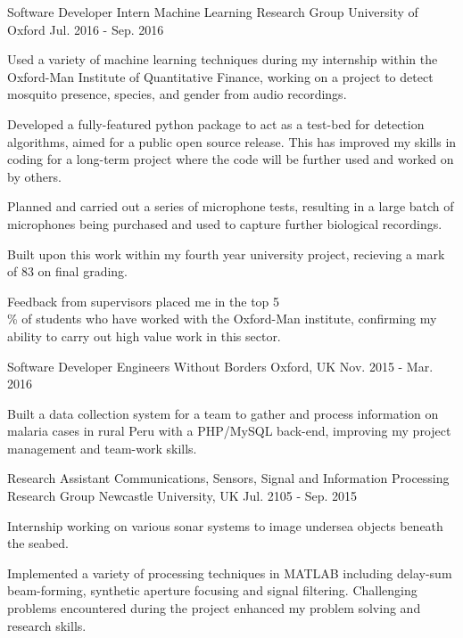 \begin{cventries}
    \cventry
        {Software Developer Intern}
        {Machine Learning Research Group}
        {University of Oxford}
        {Jul. 2016 - Sep. 2016}
        {
            \begin{cvitems}
                \item{Used a variety of machine learning techniques during my internship within the Oxford-Man Institute of Quantitative Finance, working on a project to detect mosquito presence, species, and gender from audio recordings.}
                \item{Developed a fully-featured python package to act as a test-bed for detection algorithms, aimed for a public open source release. This has improved my skills in coding for a long-term project where the code will be further used and worked on by others.}
                \item{Planned and carried out a series of microphone tests, resulting in a large batch of microphones being purchased and used to capture further biological recordings.}
                \item{Built upon this work within my fourth year university project, recieving a mark of 83 on final grading.}
                \item{Feedback from supervisors placed me in the top 5\\\% of students who have worked with the Oxford-Man institute, confirming my ability to carry out high value work in this sector.}
            \end{cvitems}
        }


    \cventry
        {Software Developer}
        {Engineers Without Borders}
        {Oxford, UK}
        {Nov. 2015 - Mar. 2016}
        {
            \begin{cvitems}
                \item{Built a data collection system for a team to gather and process information on malaria cases in rural Peru with a PHP/MySQL back-end, improving my project management and team-work skills.}
            \end{cvitems}
        }


    \cventry
        {Research Assistant}
        {Communications, Sensors, Signal and Information Processing Research Group}
        {Newcastle University, UK}
        {Jul. 2105 - Sep. 2015}
        {
            \begin{cvitems}
                \item{Internship working on various sonar systems to image undersea objects beneath the seabed.}
                \item{Implemented a variety of processing techniques in MATLAB including delay-sum beam-forming, synthetic aperture focusing and signal filtering. Challenging problems encountered during the project enhanced my problem solving and research skills.}
            \end{cvitems}
        }

\end{cventries}